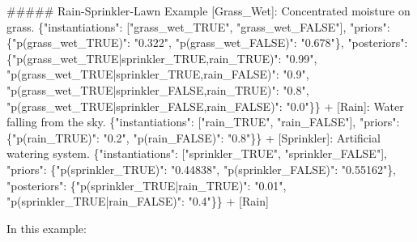 \documentclass[
  11pt,
  letterpaper,
]{book}
\newenvironment{Shaded}{\begin{snugshade}}{\end{snugshade}}
\newcommand{\DataTypeTok}[1]{\textcolor[rgb]{0.68,0.00,0.00}{#1}}
\newcommand{\ErrorTok}[1]{\textcolor[rgb]{0.68,0.00,0.00}{#1}}
\newcommand{\FunctionTok}[1]{\textcolor[rgb]{0.28,0.35,0.67}{#1}}
\newcommand{\OtherTok}[1]{\textcolor[rgb]{0.00,0.23,0.31}{#1}}
\newcommand{\StringTok}[1]{\textcolor[rgb]{0.13,0.47,0.30}{#1}}
\begin{document}
\begin{Shaded}
\begin{Highlighting}[]
\ErrorTok{\#\#\#\#\#} \ErrorTok{Rain{-}Sprinkler{-}Lawn} \ErrorTok{Example}
\OtherTok{[}\ErrorTok{Grass\_Wet}\OtherTok{]}\ErrorTok{:} \ErrorTok{Concentrated} \ErrorTok{moisture} \ErrorTok{on} \ErrorTok{grass.} \FunctionTok{\{}\DataTypeTok{"instantiations"}\FunctionTok{:} \OtherTok{[}\StringTok{"grass\_wet\_TRUE"}\OtherTok{,} \StringTok{"grass\_wet\_FALSE"}\OtherTok{]}\FunctionTok{,}
\DataTypeTok{"priors"}\FunctionTok{:} \FunctionTok{\{}\DataTypeTok{"p(grass\_wet\_TRUE)"}\FunctionTok{:} \StringTok{"0.322"}\FunctionTok{,} \DataTypeTok{"p(grass\_wet\_FALSE)"}\FunctionTok{:} \StringTok{"0.678"}\FunctionTok{\},}
\DataTypeTok{"posteriors"}\FunctionTok{:} \FunctionTok{\{}\DataTypeTok{"p(grass\_wet\_TRUE|sprinkler\_TRUE,rain\_TRUE)"}\FunctionTok{:} \StringTok{"0.99"}\FunctionTok{,}
\DataTypeTok{"p(grass\_wet\_TRUE|sprinkler\_TRUE,rain\_FALSE)"}\FunctionTok{:} \StringTok{"0.9"}\FunctionTok{,}
\DataTypeTok{"p(grass\_wet\_TRUE|sprinkler\_FALSE,rain\_TRUE)"}\FunctionTok{:} \StringTok{"0.8"}\FunctionTok{,}
\DataTypeTok{"p(grass\_wet\_TRUE|sprinkler\_FALSE,rain\_FALSE)"}\FunctionTok{:} \StringTok{"0.0"}\FunctionTok{\}\}}
 \ErrorTok{+} \OtherTok{[}\ErrorTok{Rain}\OtherTok{]}\ErrorTok{:} \ErrorTok{Water} \ErrorTok{falling} \ErrorTok{from} \ErrorTok{the} \ErrorTok{sky.} \FunctionTok{\{}\DataTypeTok{"instantiations"}\FunctionTok{:} \OtherTok{[}\StringTok{"rain\_TRUE"}\OtherTok{,} \StringTok{"rain\_FALSE"}\OtherTok{]}\FunctionTok{,}
 \DataTypeTok{"priors"}\FunctionTok{:} \FunctionTok{\{}\DataTypeTok{"p(rain\_TRUE)"}\FunctionTok{:} \StringTok{"0.2"}\FunctionTok{,} \DataTypeTok{"p(rain\_FALSE)"}\FunctionTok{:} \StringTok{"0.8"}\FunctionTok{\}\}}
 \ErrorTok{+} \OtherTok{[}\ErrorTok{Sprinkler}\OtherTok{]}\ErrorTok{:} \ErrorTok{Artificial} \ErrorTok{watering} \ErrorTok{system.} \FunctionTok{\{}\DataTypeTok{"instantiations"}\FunctionTok{:} \OtherTok{[}\StringTok{"sprinkler\_TRUE"}\OtherTok{,} \StringTok{"sprinkler\_FALSE"}\OtherTok{]}\FunctionTok{,}
 \DataTypeTok{"priors"}\FunctionTok{:} \FunctionTok{\{}\DataTypeTok{"p(sprinkler\_TRUE)"}\FunctionTok{:} \StringTok{"0.44838"}\FunctionTok{,} \DataTypeTok{"p(sprinkler\_FALSE)"}\FunctionTok{:} \StringTok{"0.55162"}\FunctionTok{\},}
 \DataTypeTok{"posteriors"}\FunctionTok{:} \FunctionTok{\{}\DataTypeTok{"p(sprinkler\_TRUE|rain\_TRUE)"}\FunctionTok{:} \StringTok{"0.01"}\FunctionTok{,} \DataTypeTok{"p(sprinkler\_TRUE|rain\_FALSE)"}\FunctionTok{:} \StringTok{"0.4"}\FunctionTok{\}\}}
   \ErrorTok{+} \OtherTok{[}\ErrorTok{Rain}\OtherTok{]}


\ErrorTok{In} \ErrorTok{this} \ErrorTok{example:}


\end{Highlighting}
\end{Shaded}
\end{document}
